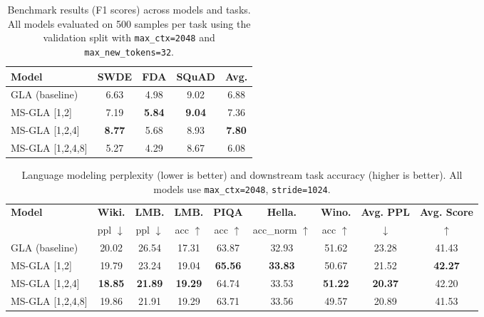 \documentclass{article}
\begin{document}
\begin{table}[ht]
    \centering
    \caption{Benchmark results (F1 scores) across models and tasks. All models evaluated on 500 samples per task using the validation split with \texttt{max\_ctx=2048} and \texttt{max\_new\_tokens=32}.}
    \label{tab:benchmark_results}
    \setlength{\tabcolsep}{8pt}
    \begin{tabular}{lcccc}
        \toprule
        \textbf{Model} & \textbf{SWDE} & \textbf{FDA} & \textbf{SQuAD} & \textbf{Avg.} \\
        \midrule
        GLA (baseline)         & 6.63 & 4.98 & 9.02 & 6.88 \\
        MS-GLA {[1,2]}         & 7.19 & \textbf{5.84} & \textbf{9.04}  & 7.36 \\
        MS-GLA {[1,2,4]}       & \textbf{8.77} & 5.68 & 8.93  & \textbf{7.80} \\
        MS-GLA {[1,2,4,8]}     & 5.27 & 4.29 & 8.67  & 6.08 \\
        \bottomrule
    \end{tabular}
\end{table}

\begin{table}[ht]
    \centering
    \caption{Language modeling perplexity (lower is better) and downstream task accuracy (higher is better). All models use \texttt{max\_ctx=2048}, \texttt{stride=1024}.}
    \label{tab:lm_results}
    \setlength{\tabcolsep}{6pt}
    \renewcommand{\arraystretch}{1.1}
    \begin{tabular}{l | cc | cccc | cc}
        \toprule
        \textbf{Model}
            & \textbf{Wiki.} & \textbf{LMB.}
            & \textbf{LMB.} & \textbf{PIQA} & \textbf{Hella.} & \textbf{Wino.}
            & \textbf{Avg. PPL} & \textbf{Avg. Score} \\
            & ppl $\downarrow$ & ppl $\downarrow$
            & acc $\uparrow$ & acc $\uparrow$ & acc\_norm $\uparrow$ & acc $\uparrow$
            & $\downarrow$ & $\uparrow$ \\
        \midrule
        GLA (baseline)     & 20.02 & 26.54 & 17.31 & 63.87 & 32.93 & 51.62 & 23.28 & 41.43 \\
        MS-GLA {[1,2]}     & 19.79 & 23.24 & 19.04 & \textbf{65.56} & \textbf{33.83} & 50.67 & 21.52 & \textbf{42.27} \\
        MS-GLA {[1,2,4]}   & \textbf{18.85} & \textbf{21.89} & \textbf{19.29} & 64.74 & 33.53 & \textbf{51.22} & \textbf{20.37} & 42.20 \\
        MS-GLA {[1,2,4,8]} & 19.86 & 21.91 & 19.29 & 63.71 & 33.56 & 49.57 & 20.89 & 41.53 \\
        \bottomrule
    \end{tabular}
\end{table}
\end{document}
